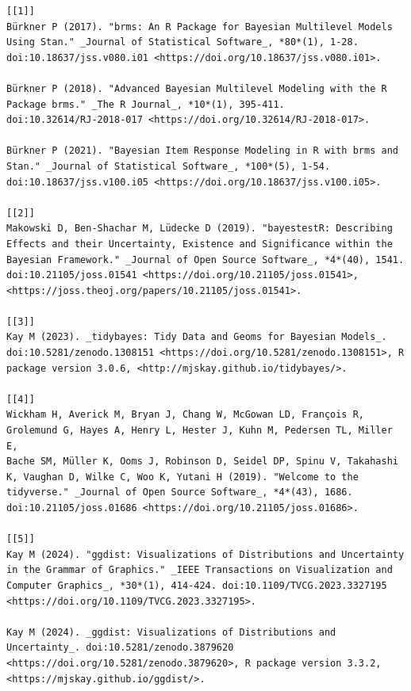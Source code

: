 \documentclass[
  doc,
  longtable,
  nolmodern,
  notxfonts,
  notimes,
  colorlinks=true,linkcolor=blue,citecolor=blue,urlcolor=blue]{apa7}
\begin{document}
\begin{verbatim}
[[1]]
Bürkner P (2017). "brms: An R Package for Bayesian Multilevel Models
Using Stan." _Journal of Statistical Software_, *80*(1), 1-28.
doi:10.18637/jss.v080.i01 <https://doi.org/10.18637/jss.v080.i01>.

Bürkner P (2018). "Advanced Bayesian Multilevel Modeling with the R
Package brms." _The R Journal_, *10*(1), 395-411.
doi:10.32614/RJ-2018-017 <https://doi.org/10.32614/RJ-2018-017>.

Bürkner P (2021). "Bayesian Item Response Modeling in R with brms and
Stan." _Journal of Statistical Software_, *100*(5), 1-54.
doi:10.18637/jss.v100.i05 <https://doi.org/10.18637/jss.v100.i05>.

[[2]]
Makowski D, Ben-Shachar M, Lüdecke D (2019). "bayestestR: Describing
Effects and their Uncertainty, Existence and Significance within the
Bayesian Framework." _Journal of Open Source Software_, *4*(40), 1541.
doi:10.21105/joss.01541 <https://doi.org/10.21105/joss.01541>,
<https://joss.theoj.org/papers/10.21105/joss.01541>.

[[3]]
Kay M (2023). _tidybayes: Tidy Data and Geoms for Bayesian Models_.
doi:10.5281/zenodo.1308151 <https://doi.org/10.5281/zenodo.1308151>, R
package version 3.0.6, <http://mjskay.github.io/tidybayes/>.

[[4]]
Wickham H, Averick M, Bryan J, Chang W, McGowan LD, François R,
Grolemund G, Hayes A, Henry L, Hester J, Kuhn M, Pedersen TL, Miller E,
Bache SM, Müller K, Ooms J, Robinson D, Seidel DP, Spinu V, Takahashi
K, Vaughan D, Wilke C, Woo K, Yutani H (2019). "Welcome to the
tidyverse." _Journal of Open Source Software_, *4*(43), 1686.
doi:10.21105/joss.01686 <https://doi.org/10.21105/joss.01686>.

[[5]]
Kay M (2024). "ggdist: Visualizations of Distributions and Uncertainty
in the Grammar of Graphics." _IEEE Transactions on Visualization and
Computer Graphics_, *30*(1), 414-424. doi:10.1109/TVCG.2023.3327195
<https://doi.org/10.1109/TVCG.2023.3327195>.

Kay M (2024). _ggdist: Visualizations of Distributions and
Uncertainty_. doi:10.5281/zenodo.3879620
<https://doi.org/10.5281/zenodo.3879620>, R package version 3.3.2,
<https://mjskay.github.io/ggdist/>.
\end{verbatim}
\end{document}
